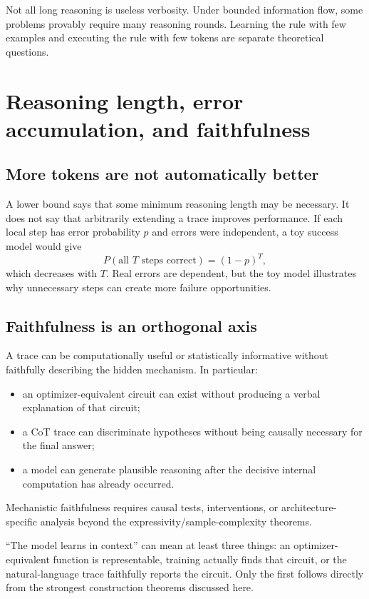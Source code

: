 \documentclass[11pt,a4paper,oneside,openany]{memoir}
\theoremstyle{definition}
\begin{document}
\begin{presentbox}
Not all long reasoning is useless verbosity.  Under bounded information flow, some problems provably require many reasoning rounds.  Learning the rule with few examples and executing the rule with few tokens are separate theoretical questions.
\end{presentbox}

\chapter{Reasoning length, error accumulation, and faithfulness}
\section{More tokens are not automatically better}
A lower bound says that some minimum reasoning length may be necessary.  It does not say that arbitrarily extending a trace improves performance.  If each local step has error probability $p$ and errors were independent, a toy success model would give
\[
P(\text{all }T\text{ steps correct})=(1-p)^T,
\]
which decreases with $T$.  Real errors are dependent, but the toy model illustrates why unnecessary steps can create more failure opportunities.

\section{Faithfulness is an orthogonal axis}
A trace can be computationally useful or statistically informative without faithfully describing the hidden mechanism.  In particular:
\begin{itemize}
\item an optimizer-equivalent circuit can exist without producing a verbal explanation of that circuit;
\item a CoT trace can discriminate hypotheses without being causally necessary for the final answer;
\item a model can generate plausible reasoning after the decisive internal computation has already occurred.
\end{itemize}
Mechanistic faithfulness requires causal tests, interventions, or architecture-specific analysis beyond the expressivity/sample-complexity theorems.

\begin{presentbox}
``The model learns in context'' can mean at least three things: an optimizer-equivalent function is representable, training actually finds that circuit, or the natural-language trace faithfully reports the circuit.  Only the first follows directly from the strongest construction theorems discussed here.
\end{presentbox}
\end{document}
